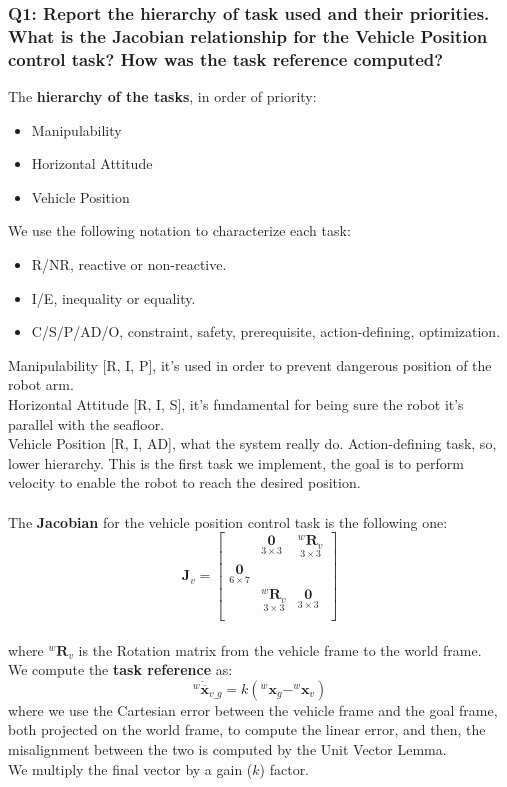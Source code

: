 \documentclass{article}
\begin{document}
\subsubsection{Q1: Report the hierarchy of task used and their priorities. What is the Jacobian relationship for the Vehicle Position control task? How was the task reference computed?}
The \textbf{hierarchy of the tasks}, in order of priority:
\begin{itemize}
    \item Manipulability 
    \item Horizontal Attitude
    \item Vehicle Position
\end{itemize}
We use the following notation to characterize each task:
\begin{itemize}
    \item R/NR, reactive or non-reactive.
    \item I/E, inequality or equality.
    \item C/S/P/AD/O, constraint, safety, prerequisite, action-defining, optimization.
\end{itemize}
Manipulability [R, I, P], it's used in order to prevent dangerous position of the robot arm. \\
Horizontal Attitude [R, I, S], it's fundamental for being sure the robot it's parallel with the seafloor. \\
Vehicle Position [R, I, AD], what the system really do. Action-defining task, so, lower hierarchy. This is the first task we implement, the goal is to perform velocity to enable the robot to reach the desired position.
\\ \\
The \textbf{Jacobian} for the vehicle position control task is the following one:
\begin{equation}
    \boldsymbol{J}_v = \begin{bmatrix}
 & \underset{3\times3}{\boldsymbol{0}} & \underset{3\times3}{^{w}\boldsymbol{R}_{v}} \\
\underset{6\times7}{\boldsymbol{0}} \\
& \underset{ 3\times 3}{^{w}\boldsymbol{R}_{v}} & \underset{3\times 3}{\boldsymbol{0}} \\
\end{bmatrix}
\end{equation}
\\ 
where ${^{w}\boldsymbol{R}_{v}}$ is the Rotation matrix from the vehicle frame to the world frame.
\\
We compute the \textbf{task reference} as:
\begin{equation}
    ^{w}\dot{\overline{\boldsymbol{x}}}_{v\_g}=k\left(^{w} \boldsymbol{x}_{g}-^{w} \boldsymbol{x}_{v}\right)
\end{equation}
where we use the Cartesian error between the vehicle frame and the goal frame, both projected on the world frame, to compute the linear error, and then, the misalignment between the two is computed by the Unit Vector Lemma.\\
We multiply the final vector by a gain ($k$) factor.
\end{document}
